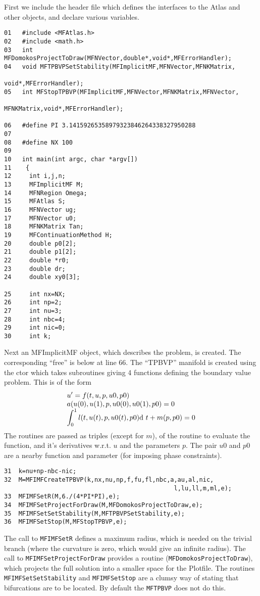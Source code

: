 \documentclass[12pt]{article}
\begin{document}
First we include the header file which defines the interfaces to the Atlas and other objects,
and declare various variables.
\begin{verbatim}
01   #include <MFAtlas.h>
02   #include <math.h>
03   int MFDomokosProjectToDraw(MFNVector,double*,void*,MFErrorHandler);
04   void MFTPBVPSetStability(MFImplicitMF,MFNVector,MFNKMatrix,
                                                           void*,MFErrorHandler);
05   int MFStopTPBVP(MFImplicitMF,MFNVector,MFNKMatrix,MFNVector,
                                                MFNKMatrix,void*,MFErrorHandler);

06   #define PI 3.14159265358979323846264338327950288
07
08   #define NX 100
09   
10   int main(int argc, char *argv[])
11    {
12     int i,j,n;
13     MFImplicitMF M;
14     MFNRegion Omega;
15     MFAtlas S;
16     MFNVector ug;
17     MFNVector u0;
18     MFNKMatrix Tan;
19     MFContinuationMethod H;
20     double p0[2];
21     double p1[2];
22     double *r0;
23     double dr;
24     double xy0[3];

25     int nx=NX;
26     int np=2;
27     int nu=3;
28     int nbc=4;
29     int nic=0;
30     int k;

\end{verbatim}
Next an {MFImplicitMF} object, which describes the problem, is created.
The corresponding ``free'' is below at line 66. The ``TPBVP'' manifold is
created using the ctor which takes subroutines giving 4 functions
defining the boundary value problem. This is of the form
\begin{displaymath}
 \begin{array}{l}
  \displaystyle u'=f(t,u,p,u0,p0)\\
  \displaystyle a(u(0),u(1),p,u0(0),u0(1),p0)=0\\
  \displaystyle \int_0^1 l(t,u(t),p,u0(t),p0) {\rm d}~t + m(p,p0) = 0\\
 \end{array}
\end{displaymath}
The routines are passed as triples (except for $m$), of the routine to evaluate the function, and
it's derivatives w.r.t. $u$ and the parameters $p$. The pair $u0$ and $p0$ are a nearby function
and parameter (for imposing phase constraints).
\begin{verbatim}
31  k=nu+np-nbc-nic;
32  M=MFIMFCreateTPBVP(k,nx,nu,np,f,fu,fl,nbc,a,au,al,nic,
                                               l,lu,ll,m,ml,e);
33  MFIMFSetR(M,6./(4*PI*PI),e);
34  MFIMFSetProjectForDraw(M,MFDomokosProjectToDraw,e);
35  MFIMFSetSetStability(M,MFTPBVPSetStability,e);
36  MFIMFSetStop(M,MFStopTPBVP,e);
\end{verbatim}
The call to {\tt MFIMFSetR} defines a maximum radius, which is needed on the trivial branch (where the curvature is zero,
which would give an infinite radius). The call to {\tt MFIMFSetProjectForDraw} provides a routine ({\tt MFDomokos\-Project\-To\-Draw}),
which projects the full solution into a smaller space for the Plotfile. The routines {\tt MFIMFSetSetStability} and
{\tt MFIMFSetStop} are a clumsy way of stating that bifurcations are to be located. By default the {\tt MFTPBVP} does not do this.
\end{document}
